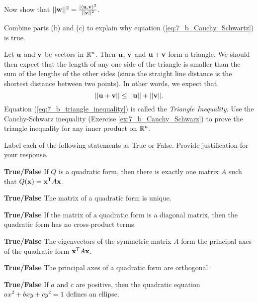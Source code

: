 	\item Now show that $||\mathbf{w}||^2 = \frac{|\langle \mathbf{u}, \mathbf{v} \rangle^2}{||\mathbf{v}||^2}$. 

	\item Combine parts (b) and (c) to explain why equation (\ref{eq:7_b_Cauchy_Schwartz}) is true. 
	

	\ea

\item Let $\mathbf{u}$ and $\mathbf{v}$ be vectors in $\mathbb{R}^n$. Then $\mathbf{u}$, $\mathbf{v}$ and $\mathbf{u}+\mathbf{v}$ form a triangle. We should then expect that the length of any one side of the triangle is smaller than the sum of the lengths of the other sides (since the straight line distance is the shortest distance between two points). In other words, we expect that 
\begin{equation} \label{eq:7_b_triangle_inequality}
||\mathbf{u} + \mathbf{v}|| \leq ||\mathbf{u}|| + ||\mathbf{v}||.
\end{equation}
Equation (\ref{eq:7_b_triangle_inequality}) is called the \emph{Triangle Inequality}. Use the Cauchy-Schwarz inequality (Exercise \ref{ex:7_b_Cauchy_Schwarz}) to prove the triangle inequality for any inner product on $\mathbb{R}^n$.
	
\item Label each of the following statements as True or False. Provide justification for your response. 
	\ba
	\item \textbf{True/False} If $Q$ is a quadratic form, then there is exactly one matrix $A$ such that $Q(\mathbf{x}) = \mathbf{x}^{\mathsf{T}}A\mathbf{x}$. 	

	\item \textbf{True/False} The matrix of a quadratic form is unique.
	
	\item \textbf{True/False} If the matrix of a quadratic form is a diagonal matrix, then the quadratic form has no cross-product terms. 
	

	\item \textbf{True/False} The eigenvectors of the symmetric matrix $A$ form the principal axes of the quadratic form $\mathbf{x}^{\mathsf{T}}A\mathbf{x}$. 

	\item \textbf{True/False} The principal axes of a quadratic form are orthogonal.

	\item \textbf{True/False} If $a$ and $c$ are positive, then the quadratic equation $ax^2 + bxy + cy^2 = 1$ defines an ellipse.  

